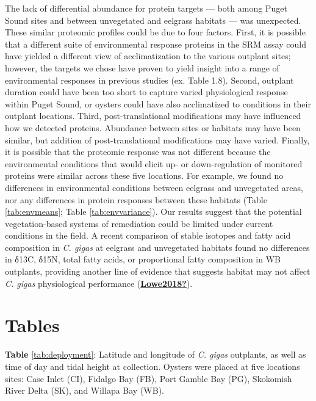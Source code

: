 \documentclass [11pt, proquest] {uwthesis}[2015/03/03]
\begin{document}
The lack of differential abundance for protein targets --- both among Puget Sound sites and between unvegetated and eelgrass habitats --- was unexpected. These similar proteomic profiles could be due to four factors. First, it is possible that a different suite of environmental response proteins in the SRM assay could have yielded a different view of acclimatization to the various outplant sites; however, the targets we chose have proven to yield insight into a range of environmental responses in previous studies (ex. Table 1.8). Second, outplant duration could have been too short to capture varied physiological response within Puget Sound, or oysters could have also acclimatized to conditions in their outplant locations. Third, post-translational modifications may have influenced how we detected proteins. Abundance between sites or habitats may have been similar, but addition of post-translational modifications may have varied. Finally, it is possible that the proteomic response was not different because the environmental conditions that would elicit up- or down-regulation of monitored proteins were similar across these five locations. For example, we found no differences in environmental conditions between eelgrass and unvegetated areas, nor any differences in protein responses between these habitats (Table \ref{tab:envmeans}; Table \ref{tab:envvariance}). Our results suggest that the potential vegetation-based systems of remediation could be limited under current conditions in the field. A recent comparison of stable isotopes and fatty acid composition in \emph{C. gigas} at eelgrass and unvegetated habitats found no differences in δ13C, δ15N, total fatty acids, or proportional fatty composition in WB outplants, providing another line of evidence that suggests habitat may not affect \emph{C. gigas} physiological performance (\protect\hyperlink{ref-Lowe2018}{\textbf{Lowe2018?}}).

\hypertarget{tables}{%
\section{Tables}\label{tables}}

\textbf{Table} \ref{tab:deployment}: Latitude and longitude of \emph{C. gigas} outplants, as well as time of day and tidal height at collection. Oysters were placed at five locations sites: Case Inlet (CI), Fidalgo Bay (FB), Port Gamble Bay (PG), Skokomish River Delta (SK), and Willapa Bay (WB).
\end{document}
